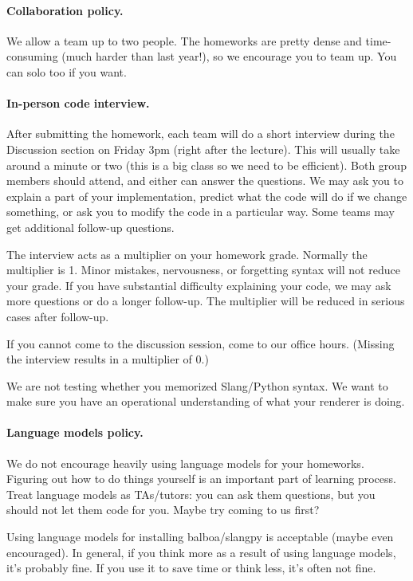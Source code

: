 \paragraph{Collaboration policy.} We allow a team up to two people. The homeworks are pretty dense and time-consuming (much harder than last year!), so we encourage you to team up. You can solo too if you want.

\paragraph{In-person code interview.} After submitting the homework, each team will do
a short interview during the Discussion section on Friday 3pm (right after the lecture). This will usually take around a minute or two (this is a big class so we need to be efficient). 
Both group members should attend, and either can answer the questions.
We may ask you to explain a part of
your implementation, predict what the code will do if we change something, or ask you
to modify the code in a particular way. Some teams may get additional follow-up questions.

The interview acts as a multiplier on your homework grade. Normally the multiplier
is 1. Minor mistakes, nervousness, or forgetting syntax will not reduce your grade.
If you have substantial difficulty explaining your code, we may ask more questions or do a longer follow-up.
The multiplier will be reduced in serious cases after follow-up.

If you cannot come to the discussion session, come to our office hours.
(Missing the interview results in a multiplier of 0.)

We are not testing whether you memorized Slang/Python syntax. We want to make sure
you have an operational understanding of what your renderer is doing.

\paragraph{Language models policy.} We do not encourage heavily using language models
for your homeworks. Figuring out how to do things yourself is an important part of learning
process. Treat language models as TAs/tutors: you can ask them questions, but you should
not let them code for you. Maybe try coming to us first? 

Using language models for installing balboa/slangpy is acceptable (maybe even encouraged). 
In general, if you think more as a result of using language models, it's probably fine. 
If you use it to save time or think less, it's often not fine.

